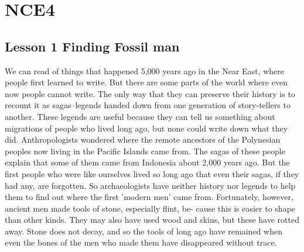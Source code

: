 \documentclass[kindlepaper]{BHCexam4kindle}
\begin{document}
\section{NCE4}
\clearpage
\subsection{Lesson 1
Finding Fossil man}
\par
We can read of things that happened 5,000 years ago in the Near East, where
people first learned to write. But there are some parts of the world where even
now people cannot write. The only way that they can preserve their history is to
recount it as sagas--legends handed down from one generation of story-tellers
to another. These legends are useful because they can tell us something about
migrations of people who lived long ago, but none could write down what they
did. Anthropologists wondered where the remote ancestors of the Polynesian
peoples now living in the Pacific Islands came from. The sagas of these people
explain that some of them came from Indonesia about 2,000 years ago.
But the first people who were like ourselves lived so long ago that even their
sagas, if they had any, are forgotten. So archaeologists have neither history nor
legends to help them to find out where the first 'modern men' came from.
Fortunately, however, ancient men made tools of stone, especially flint, be-
cause this is easier to shape than other kinds. They may also have used wood
and skins, but these have rotted away. Stone does not decay, and so the tools of
long ago have remained when even the bones of the men who made them have
disappeared without trace.

\clearpage
\end{document}
